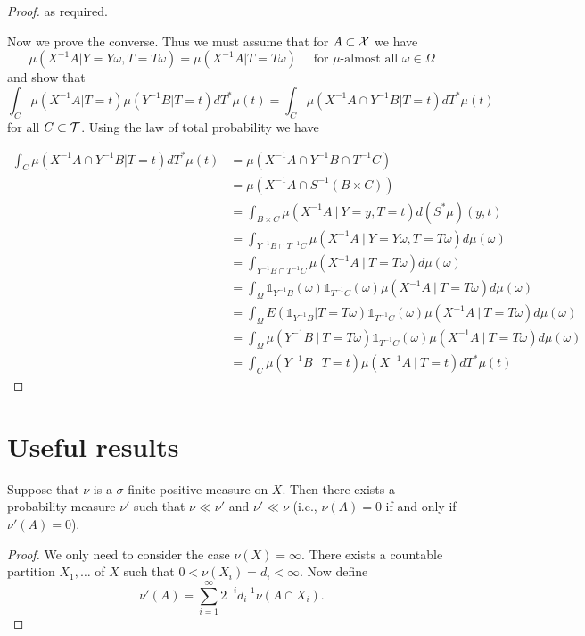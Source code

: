 \documentclass[twoside, a4paper, 10pt]{amsart}
\begin{document}
\begin{eg}
\begin{proof}
as required. 

Now we prove the converse. Thus we must assume that for $A \subset \mathcal{X}$ we have $$\mu(X^{-1}A | Y=Y\omega, T=T\omega) = \mu(X^{-1}A|T=T\omega) \quad \text{ for $\mu$-almost all $\omega \in \Omega$}$$ and show that $$\int_{C} \mu(X^{-1}A | T=t)\mu(Y^{-1}B | T=t) dT^*\mu(t) = \int_{C} \mu(X^{-1}A \cap Y^{-1}B | T=t) dT^*\mu(t)$$ for all $C \subset \mathcal{T}$. Using the law of total probability we have

\begin{align*} \int_{C} \mu(X^{-1}A \cap Y^{-1}B | T=t) dT^*\mu(t) &= \mu(X^{-1}A \cap Y^{-1}B \cap T^{-1}C) \\ 
&=\mu(X^{-1}A \cap S^{-1}(B \times C))  \\
&= \int_{B \times C} \mu(X^{-1}A~|~ Y=y, T=t) d(S^*\mu)(y,t) \\ 
&= \int_{Y^{-1}B \cap T^{-1}C} \mu(X^{-1}A~|~ Y=Y\omega, T=T\omega) d\mu(\omega) \\
&= \int_{Y^{-1}B \cap T^{-1}C} \mu(X^{-1}A~|~ T=T\omega) d\mu(\omega) \\
&= \int_{\Omega} \mathds{1}_{Y^{-1}B}(\omega) \mathds{1}_{T^{-1}C}(\omega) \mu(X^{-1}A~|~ T=T\omega) d\mu(\omega) \\
&=\int_{\Omega} E(\mathds{1}_{Y^{-1}B}|T=T\omega) \mathds{1}_{T^{-1}C}(\omega) \mu(X^{-1}A~|~ T=T\omega) d\mu(\omega) \\ 
&= \int_{\Omega} \mu(Y^{-1}B ~|~ T=T\omega) \mathds{1}_{T^{-1}C}(\omega) \mu(X^{-1}A~|~ T=T\omega) d\mu(\omega) \\ 
&= \int_{C} \mu(Y^{-1}B~|~ T=t) \mu(X^{-1}A ~|~ T=t) dT^*\mu(t) \end{align*}

\end{proof}

\end{eg}

\section{Useful results}

\begin{lemma} Suppose that $\nu$ is a $\sigma$-finite positive measure on $X$. Then there exists a probability measure $\nu'$ such that $\nu \ll \nu'$ and $\nu' \ll \nu$ (i.e., $\nu(A) = 0$ if and only if $\nu'(A) = 0$).

\end{lemma}

\begin{proof} We only need to consider the case $\nu(X) = \infty$. There exists a countable partition $X_1, \ldots$ of $X$ such that $0< \nu(X_i) = d_i < \infty$. Now define $$\nu'(A) = \sum_{i=1}^{\infty} 2^{-i}d_i^{-1} \nu(A \cap X_i).$$

\end{proof}
\end{document}
